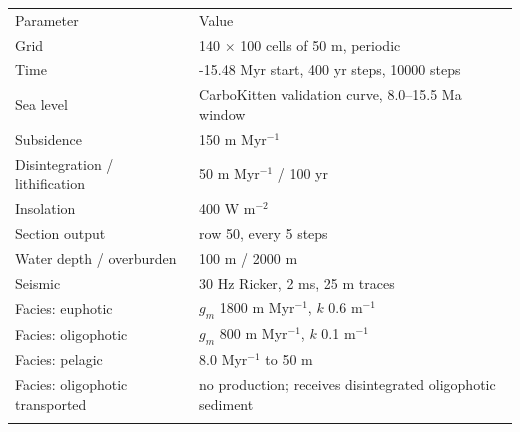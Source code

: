 \begin{tabular}{ll}
\tophline
Parameter & Value \\
\middlehline
Grid & 140 $\times$ 100 cells of 50 m, periodic \\
Time & -15.48 Myr start, 400 yr steps, 10000 steps \\
Sea level & CarboKitten validation curve, 8.0--15.5 Ma window \\
Subsidence & 150 m Myr$^{-1}$ \\
Disintegration / lithification & 50 m Myr$^{-1}$ / 100 yr \\
Insolation & 400 W m$^{-2}$ \\
Section output & row 50, every 5 steps \\
Water depth / overburden & 100 m / 2000 m \\
Seismic & 30 Hz Ricker, 2 ms, 25 m traces \\
Facies: euphotic & $g_m$ 1800 m Myr$^{-1}$, $k$ 0.6 m$^{-1}$ \\
Facies: oligophotic & $g_m$ 800 m Myr$^{-1}$, $k$ 0.1 m$^{-1}$ \\
Facies: pelagic & 8.0 Myr$^{-1}$ to 50 m \\
Facies: oligophotic transported & no production; receives disintegrated oligophotic sediment \\
\bottomhline
\end{tabular}
